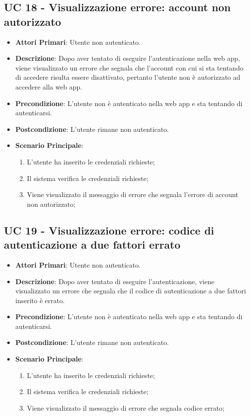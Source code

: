 
		\subsection{UC 18 - Visualizzazione errore: account non autorizzato}
		\begin{itemize}
			\item \textbf{Attori Primari}: Utente non autenticato.
			\item \textbf{Descrizione}: Dopo aver tentato di eseguire l'autenticazione nella web app, viene visualizzato un errore che segnala che l'account con cui si sta tentando di accedere risulta essere disattivato, pertanto l'utente non è autorizzato ad accedere alla web app.
			\item \textbf{Precondizione}: L'utente non è autenticato nella web app e sta tentando di autenticarsi.
			\item \textbf{Postcondizione}: L'utente rimane non autenticato.
			\item \textbf{Scenario Principale}:
			\begin{enumerate}
				\item L'utente ha inserito le credenziali richieste;
				\item Il sistema verifica le credenziali richieste;
				\item Viene visualizzato il messaggio di errore che segnala l'errore di account non autorizzato;
			\end{enumerate}
		\end{itemize}


		\subsection{UC 19 - Visualizzazione errore: codice di autenticazione a due fattori errato}
		\begin{itemize}
			\item \textbf{Attori Primari}: Utente non autenticato.
			\item \textbf{Descrizione}: Dopo aver tentato di eseguire l'autenticazione, viene visualizzato un errore che segnala che il codice di autenticazione a due fattori inserito è errato.
			\item \textbf{Precondizione}: L'utente non è autenticato nella web app e sta tentando di autenticarsi.
			\item \textbf{Postcondizione}: L'utente rimane non autenticato.
			\item \textbf{Scenario Principale}:
			\begin{enumerate}
				\item L'utente ha inserito le credenziali richieste;
				\item Il sistema verifica le credenziali richieste;
				\item Viene visualizzato il messaggio di errore che segnala codice errato;
			\end{enumerate}
		\end{itemize}


